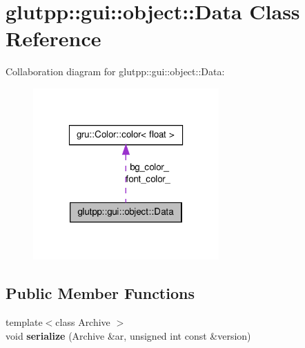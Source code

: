 \hypertarget{classglutpp_1_1gui_1_1object_1_1Data}{\section{glutpp\-:\-:gui\-:\-:object\-:\-:\-Data \-Class \-Reference}
\label{classglutpp_1_1gui_1_1object_1_1Data}
}


\-Collaboration diagram for glutpp\-:\-:gui\-:\-:object\-:\-:\-Data\-:
\nopagebreak
\begin{figure}[H]
\begin{center}
\leavevmode
\includegraphics[width=202pt]{classglutpp_1_1gui_1_1object_1_1Data__coll__graph}
\end{center}
\end{figure}
\subsection*{\-Public \-Member \-Functions}
\begin{DoxyCompactItemize}
\item 
\hypertarget{classglutpp_1_1gui_1_1object_1_1Data_a91e87c77d8ed816368ec17551ef8a35b}{{\footnotesize template$<$class Archive $>$ }\\void {\bfseries serialize} (\-Archive \&ar, unsigned int const \&version)}\label{classglutpp_1_1gui_1_1object_1_1Data_a91e87c77d8ed816368ec17551ef8a35b}

\end{DoxyCompactItemize}
